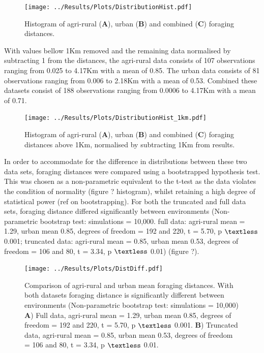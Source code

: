 \documentclass[11pt,usenames,dvipsnames]{article}
\begin{document}
\begin{figure}[H]
	\centering
	\texttt{[image: ../Results/Plots/DistributionHist.pdf]}
	\caption{Histogram of agri-rural (\textbf{A}), urban (\textbf{B}) and combined (\textbf{C}) foraging distances.}
\end{figure}
\begin{linenumbers}

With values bellow 1Km removed and the remaining data normalised by subtracting 1 from the distances, the agri-rural data consists of 107 observations ranging from 0.025 to 4.17Km with a mean of 0.85. The urban data consists of 81 observations ranging from 0.006 to 2.18Km with a mean of 0.53. Combined these datasets consist of 188 observations ranging from 0.0006 to 4.17Km with a mean of 0.71.
\end{linenumbers}
\begin{figure}[H]
	\centering
	\texttt{[image: ../Results/Plots/DistributionHist\_1km.pdf]}
	\caption{Histogram of agri-rural (\textbf{A}), urban (\textbf{B}) and combined (\textbf{C}) foraging distances above 1Km, normalised by subtracting 1Km from results.}
\end{figure}
\begin{linenumbers}

In order to accommodate for the difference in distributions between these two data sets, foraging distances were compared using a bootstrapped hypothesis test. This was chosen as a non-parametric equivalent to the t-test as the data violates the condition of normality (figure ? histogram), whilst retaining a high degree of statistical power (ref on bootstrapping). For both the truncated and full data sets, foraging distance differed significantly between environments (Non-parametric bootstrap test: simulations = 10,000. full data: agri-rural mean = 1.29, urban mean 0.85, degrees of freedom = 192 and 220, t = 5.70, p $\textless$ 0.001; truncated data: agri-rural mean = 0.85, urban mean 0.53, degrees of freedom = 106 and 80, t = 3.34, p $\textless$ 0.01) (figure ?). 
\end{linenumbers}
\begin{figure}[H]
	\centering
	\texttt{[image: ../Results/Plots/DistDiff.pdf]}
	\caption{Comparison of agri-rural and urban mean foraging distances. With both datasets foraging distance is significantly different between environments (Non-parametric bootstrap test: simulations = 10,000) \textbf{A}) Full data, agri-rural mean = 1.29, urban mean 0.85, degrees of freedom = 192 and 220, t = 5.70, p $\textless$ 0.001. \textbf{B}) Truncated data, agri-rural mean = 0.85, urban mean 0.53, degrees of freedom = 106 and 80, t = 3.34, p $\textless$ 0.01.}
\end{figure}
\end{document}
